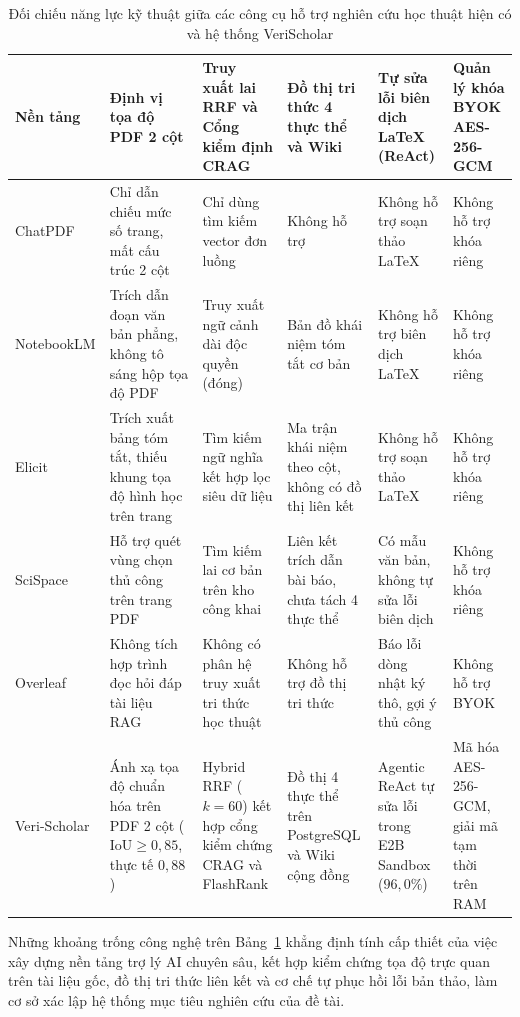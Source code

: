 \begin{table}[!htbp]
\centering
\caption{Đối chiếu năng lực kỹ thuật giữa các công cụ hỗ trợ nghiên cứu học thuật hiện có và hệ thống VeriScholar}
\label{tab:related_systems_comparison}
\setlength{\tabcolsep}{5pt}
\renewcommand{\arraystretch}{1.20}
\begin{tabularx}{\textwidth}{|>{\centering\arraybackslash}m{2.3cm}|>{\raggedright\arraybackslash}X|>{\raggedright\arraybackslash}X|>{\raggedright\arraybackslash}X|>{\raggedright\arraybackslash}X|>{\raggedright\arraybackslash}X|}
\hline
\textbf{Nền tảng} & \centering\textbf{Định vị tọa độ PDF 2 cột} & \centering\textbf{Truy xuất lai RRF và Cổng kiểm định CRAG} & \centering\textbf{Đồ thị tri thức 4 thực thể và Wiki} & \centering\textbf{Tự sửa lỗi biên dịch LaTeX (ReAct)} & \centering\textbf{Quản lý khóa BYOK AES-256-GCM} \tabularnewline \hline
ChatPDF & Chỉ dẫn chiếu mức số trang, mất cấu trúc 2 cột & Chỉ dùng tìm kiếm vector đơn luồng & Không hỗ trợ & Không hỗ trợ soạn thảo LaTeX & Không hỗ trợ khóa riêng \tabularnewline \hline
Note\-book\-LM & Trích dẫn đoạn văn bản phẳng, không tô sáng hộp tọa độ PDF & Truy xuất ngữ cảnh dài độc quyền (đóng) & Bản đồ khái niệm tóm tắt cơ bản & Không hỗ trợ biên dịch LaTeX & Không hỗ trợ khóa riêng \tabularnewline \hline
Elicit & Trích xuất bảng tóm tắt, thiếu khung tọa độ hình học trên trang & Tìm kiếm ngữ nghĩa kết hợp lọc siêu dữ liệu & Ma trận khái niệm theo cột, không có đồ thị liên kết & Không hỗ trợ soạn thảo LaTeX & Không hỗ trợ khóa riêng \tabularnewline \hline
SciSpace & Hỗ trợ quét vùng chọn thủ công trên trang PDF & Tìm kiếm lai cơ bản trên kho công khai & Liên kết trích dẫn bài báo, chưa tách 4 thực thể & Có mẫu văn bản, không tự sửa lỗi biên dịch & Không hỗ trợ khóa riêng \tabularnewline \hline
Overleaf & Không tích hợp trình đọc hỏi đáp tài liệu RAG & Không có phân hệ truy xuất tri thức học thuật & Không hỗ trợ đồ thị tri thức & Báo lỗi dòng nhật ký thô, gợi ý thủ công & Không hỗ trợ BYOK \tabularnewline \hline
\mbox{Veri-}\allowbreak\mbox{Scholar} & Ánh xạ tọa độ chuẩn hóa trên PDF 2 cột ($\text{IoU} \ge 0{,}85$, thực tế $0{,}88$) & Hybrid RRF ($k=60$) kết hợp cổng kiểm chứng CRAG và FlashRank & Đồ thị 4 thực thể trên Post\-gre\-SQL và Wiki cộng đồng & Agentic ReAct tự sửa lỗi trong E2B Sandbox ($96{,}0\%$) & Mã hóa AES-256-GCM, giải mã tạm thời trên RAM \tabularnewline \hline
\end{tabularx}
\end{table}

Những khoảng trống công nghệ trên Bảng~\ref{tab:related_systems_comparison} khẳng định tính cấp thiết của việc xây dựng nền tảng trợ lý AI chuyên sâu, kết hợp kiểm chứng tọa độ trực quan trên tài liệu gốc, đồ thị tri thức liên kết và cơ chế tự phục hồi lỗi bản thảo, làm cơ sở xác lập hệ thống mục tiêu nghiên cứu của đề tài.
